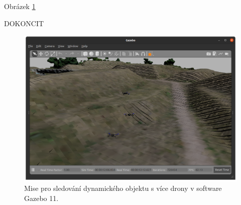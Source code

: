 Obrázek \ref{fig:SIM3MULGAZ}

DOKONCIT

\begin{figure}[!ht]
  \begin{center}
    \includegraphics[scale=0.38]{obrazky/GAZMULTIPLE.png}
  \end{center}
  \caption[Mise pro sledování dynamického objektu s více drony v software Gazebo 11]{Mise pro sledování dynamického objektu s více drony v software Gazebo 11.}
  \label{fig:SIM3MULGAZ}
\end{figure}
